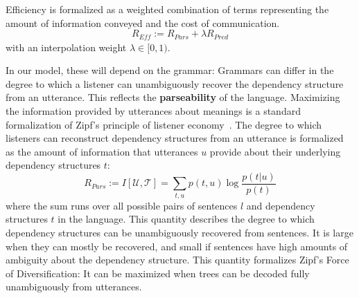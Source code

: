 \documentclass[9pt,twocolumn,twoside,lineno]{pnas-new}
\newcommand{\key}[1]{\textbf{#1}}
\begin{document}
Efficiency is formalized as a weighted combination of terms representing the amount of information conveyed and the cost of communication.
\begin{equation}\label{eq:efficiency}
	R_{\textit{Eff}} := R_{\textit{Pars}} + \lambda R_\textit{Pred}
\end{equation}
with an interpolation weight $\lambda \in [0,1)$. %



In our model, these will depend on the grammar:
Grammars can differ in the degree to which a listener can unambiguously recover the dependency structure from an utterance.
This reflects the \key{parseability} of the language.
Maximizing the information provided by utterances about meanings is a standard formalization of Zipf's principle of listener economy~\cite{frank2012predicting,regier2015word}.
The degree to which listeners can reconstruct dependency structures from an utterance is formalized as the amount of information that utterances $u$ provide about their underlying dependency structures $t$:
\begin{equation}
	R_{Pars} := I[\mathcal{U},\mathcal{T}] = \sum_{t,u} p(t,u) \log \frac{p(t|u)}{p(t)}
\end{equation}
where the sum runs over all possible pairs of sentences $l$ and dependency structures $t$ in the language.
This quantity describes the degree to which dependency structures can be unambiguously recovered from sentences.
It is large when they can mostly be recovered, and small if sentences have high amounts of ambiguity about the dependency structure.
This quantity formalizes Zipf's Force of Diversification:
It can be maximized when trees can be decoded fully unambiguously from utterances.
\end{document}

